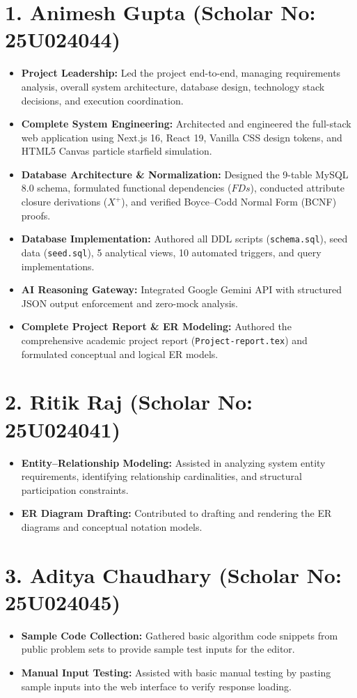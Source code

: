 \documentclass[12pt,a4paper]{report}
\DeclareRobustCommand{\_}{\textunderscore\allowbreak}
\begin{document}
\section*{1. Animesh Gupta (Scholar No: 25U024044)}
\begin{itemize}
    \item \textbf{Project Leadership:} Led the project end-to-end, managing requirements analysis, overall system architecture, database design, technology stack decisions, and execution coordination.
    \item \textbf{Complete System Engineering:} Architected and engineered the full-stack web application using Next.js 16, React 19, Vanilla CSS design tokens, and HTML5 Canvas particle starfield simulation.
    \item \textbf{Database Architecture \& Normalization:} Designed the 9-table MySQL 8.0 schema, formulated functional dependencies ($FDs$), conducted attribute closure derivations ($X^+$), and verified Boyce--Codd Normal Form (BCNF) proofs.
    \item \textbf{Database Implementation:} Authored all DDL scripts (\texttt{schema.sql}), seed data (\texttt{seed.sql}), 5 analytical views, 10 automated triggers, and query implementations.
    \item \textbf{AI Reasoning Gateway:} Integrated Google Gemini API with structured JSON output enforcement and zero-mock analysis.
    \item \textbf{Complete Project Report \& ER Modeling:} Authored the comprehensive academic project report (\texttt{Project-report.tex}) and formulated conceptual and logical ER models.
\end{itemize}

\section*{2. Ritik Raj (Scholar No: 25U024041)}
\begin{itemize}
    \item \textbf{Entity--Relationship Modeling:} Assisted in analyzing system entity requirements, identifying relationship cardinalities, and structural participation constraints.
    \item \textbf{ER Diagram Drafting:} Contributed to drafting and rendering the ER diagrams and conceptual notation models.
\end{itemize}

\section*{3. Aditya Chaudhary (Scholar No: 25U024045)}
\begin{itemize}
    \item \textbf{Sample Code Collection:} Gathered basic algorithm code snippets from public problem sets to provide sample test inputs for the editor.
    \item \textbf{Manual Input Testing:} Assisted with basic manual testing by pasting sample inputs into the web interface to verify response loading.
\end{itemize}
\end{document}
